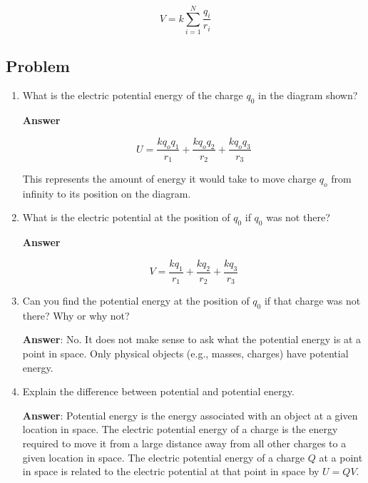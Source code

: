\documentclass{article}
\begin{document}
$$
V=k \sum_{i=1}^N {\frac{q_i}{r_i}}
$$

\newpage

\subsection{Problem}



\begin{enumerate}

  \item What is the electric potential energy of the charge $q_0$ in the diagram shown?

        \ifsolutions
        {\bf Answer}

        $$
        U = \frac{kq_oq_1}{r_1}+\frac{kq_oq_2}{r_2}+\frac{kq_oq_3}{r_3}
        $$

        This represents the amount of energy it would take to move charge $q_o$ from infinity to its position on the 
        diagram.
        \else

        \vskip 48pt
        \fi

  \item What is the electric potential at the position of $q_0$ if $q_0$ was not there?

        \ifsolutions
        {\bf Answer}

        $$
        V = \frac{kq_1}{r_1}+\frac{kq_2}{r_2}+\frac{kq_3}{r_3}
        $$

        \else

        \vskip 48pt
        \fi

  \item Can you find the potential energy at the position of $q_0$ if that charge was not there? Why or why not?

        \ifsolutions
        {\bf Answer}: No. It does not make sense to ask what the potential energy is at a point in space. Only physical objects (e.g., masses, charges) have potential energy.
        \else

        \vskip 48pt
        \fi

  \item Explain the difference between potential and potential energy.

        \ifsolutions
        {\bf Answer}: Potential energy is the energy associated with an object at a given location in space. The electric potential energy of a charge is the energy required to move it from a large distance away from all other charges to a given location in space. The electric potential energy of a charge $Q$ at a point in space is related to the electric potential at that point in space by $U=QV$.
        \else

        \vskip 48pt
        \fi

\end{enumerate}
\end{document}
